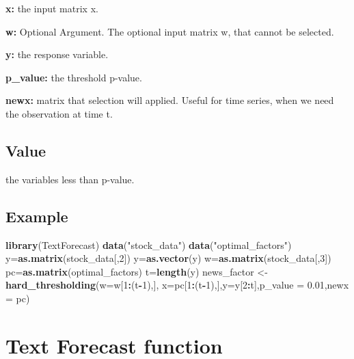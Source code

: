 \documentclass[]{article}
\newenvironment{Shaded}{\begin{snugshade}}{\end{snugshade}}
\newcommand{\KeywordTok}[1]{\textcolor[rgb]{0.13,0.29,0.53}{\textbf{#1}}}
\newcommand{\DataTypeTok}[1]{\textcolor[rgb]{0.13,0.29,0.53}{#1}}
\newcommand{\DecValTok}[1]{\textcolor[rgb]{0.00,0.00,0.81}{#1}}
\newcommand{\FloatTok}[1]{\textcolor[rgb]{0.00,0.00,0.81}{#1}}
\newcommand{\StringTok}[1]{\textcolor[rgb]{0.31,0.60,0.02}{#1}}
\newcommand{\OperatorTok}[1]{\textcolor[rgb]{0.81,0.36,0.00}{\textbf{#1}}}
\newcommand{\NormalTok}[1]{#1}
\begin{document}
\textbf{x:} the input matrix x.

\textbf{w:} Optional Argument. The optional input matrix w, that cannot
be selected.

\textbf{y:} the response variable.

\textbf{p\_value:} the threshold p-value.

\textbf{newx:} matrix that selection will applied. Useful for time
series, when we need the observation at time t.

\subsection{Value}\label{value-7}

the variables less than p-value.

\subsection{Example}\label{example-7}

\begin{Shaded}
\begin{Highlighting}[]
\KeywordTok{library}\NormalTok{(TextForecast)}
\KeywordTok{data}\NormalTok{(}\StringTok{"stock_data"}\NormalTok{)}
\KeywordTok{data}\NormalTok{(}\StringTok{"optimal_factors"}\NormalTok{)}
\NormalTok{y=}\KeywordTok{as.matrix}\NormalTok{(stock_data[,}\DecValTok{2}\NormalTok{])}
\NormalTok{y=}\KeywordTok{as.vector}\NormalTok{(y)}
\NormalTok{w=}\KeywordTok{as.matrix}\NormalTok{(stock_data[,}\DecValTok{3}\NormalTok{])}
\NormalTok{pc=}\KeywordTok{as.matrix}\NormalTok{(optimal_factors)}
\NormalTok{t=}\KeywordTok{length}\NormalTok{(y)}
\NormalTok{news_factor <-}\StringTok{ }\KeywordTok{hard_thresholding}\NormalTok{(}\DataTypeTok{w=}\NormalTok{w[}\DecValTok{1}\OperatorTok{:}\NormalTok{(t}\OperatorTok{-}\DecValTok{1}\NormalTok{),],}
\DataTypeTok{x=}\NormalTok{pc[}\DecValTok{1}\OperatorTok{:}\NormalTok{(t}\OperatorTok{-}\DecValTok{1}\NormalTok{),],}\DataTypeTok{y=}\NormalTok{y[}\DecValTok{2}\OperatorTok{:}\NormalTok{t],}\DataTypeTok{p_value =} \FloatTok{0.01}\NormalTok{,}\DataTypeTok{newx =}\NormalTok{ pc)}
\end{Highlighting}
\end{Shaded}

\section{Text Forecast function}\label{text-forecast-function}
\end{document}
